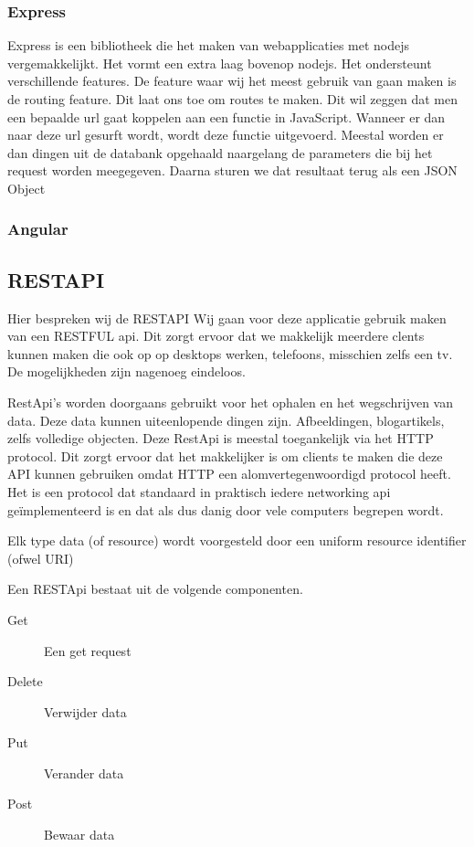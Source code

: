 \documentclass[a4paper,11pt]{article}
\begin{document}
\subsubsection{Express}
Express is een bibliotheek die het maken van webapplicaties met nodejs vergemakkelijkt. Het vormt een extra laag bovenop nodejs. Het ondersteunt verschillende features. De feature waar wij het meest gebruik van gaan maken is de routing feature. Dit laat ons toe om routes te maken. Dit wil zeggen dat men een bepaalde url gaat koppelen aan een functie in JavaScript. Wanneer er dan naar deze url gesurft wordt, wordt deze functie uitgevoerd. Meestal worden er dan dingen uit de databank opgehaald naargelang de parameters die bij het request worden meegegeven. Daarna sturen we dat resultaat terug als een JSON Object

\subsubsection{Angular}

\subsection{RESTAPI} %
Hier bespreken wij de RESTAPI
Wij gaan voor deze applicatie gebruik maken van een RESTFUL api. Dit zorgt
ervoor dat we makkelijk meerdere clents kunnen maken die ook op op desktops
werken, telefoons, misschien zelfs een tv. De mogelijkheden zijn nagenoeg
eindeloos.

RestApi's worden doorgaans gebruikt voor het ophalen en het wegschrijven van
data. Deze data kunnen uiteenlopende dingen zijn. Afbeeldingen, blogartikels,
zelfs volledige objecten. Deze RestApi is meestal toegankelijk via het HTTP
protocol. Dit zorgt ervoor dat het makkelijker is om clients te maken die deze
API kunnen gebruiken omdat HTTP een alomvertegenwoordigd protocol heeft. Het is
een protocol dat standaard in praktisch iedere networking api geïmplementeerd is
en dat als dus danig door vele computers begrepen wordt.

Elk type data (of resource) wordt voorgesteld door een uniform resource
identifier (ofwel URI)

Een RESTApi bestaat uit de volgende componenten.
\begin{description}
  \item [Get] Een get request
  \item [Delete] Verwijder data
  \item [Put] Verander data
  \item [Post] Bewaar data
\end{description}
\end{document}
